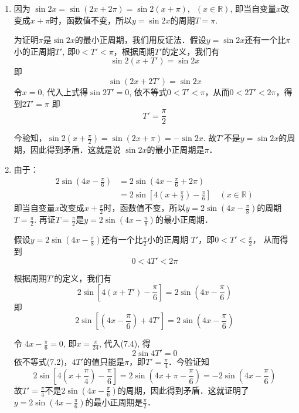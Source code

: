 \begin{solution}
\begin{enumerate}
\item
    因为 $\sin2x =\sin(2x+2\pi)=\sin 2(x+\pi), \;\; (x\in\mathbb{R})$, 即当自变量$x$改变成$x+\pi$时，函数值不变，所以$y=\sin2x$的周期$T=\pi$.

为证明$\pi$是$\sin2x$的最小正周期，我们用反证法．假设$y=\sin2x$还有一个比$\pi$小的正周期$T'$, 即$0<T'<\pi$，根据周期$T'$的定义，我们有
\[\sin2 (x+T') =\sin2x\]
即
$$\sin (2x+2T') =\sin2x$$
令$x=0$, 代入上式得$\sin 2T'=0$,
依不等式$0<T'<\pi$，从而$0<2T'<2\pi$，得到$2T'=\pi$
即
\[T'=\frac{\pi}{2}\]

今验知，$\sin2\left(x+\frac{\pi}{2}\right)=\sin(2x+\pi)=-\sin2x$. 故$T'$不是$y=\sin2x$的周期，因此得到矛盾．这就是说 $\sin 2x$的最小正周期是$\pi$．



\item 由于：
\[\begin{split}
    2\sin\left(4x-\frac{\pi}{6}\right)&=2\sin\left(4x-\frac{\pi}{6}+2\pi\right)\\
    &=2\sin\left[4\left(x+\frac{\pi}{2}\right)-\frac{\pi}{6}\right]\quad (x\in\mathbb{R})
\end{split}\]
即当自变量$x$改变成$x+\frac{\pi}{2}$时，函数值不变，所以$y=
2\sin\left(4x-\frac{\pi}{8}\right)$的周期$T=\frac{\pi}{2}$. 再证$T=\frac{\pi}{2}$是$y=2\sin\left(4x-\frac{\pi}{8}\right)$的最小正周期．

假设$y=2\sin\left(4x-\frac{\pi}{8}\right)$还有一个比$\frac{\pi}{2}$小的正周期
$T'$，即$0<T'<\frac{\pi}{2}$，
从而得到
\begin{equation}
    0<4T'<2\pi
\end{equation}

根据周期$T'$的定义，我们有
\begin{equation}
    2\sin \left[4(x+T')-\frac{\pi}{6}\right]=2\sin \left(4x-\frac{\pi}{6}\right)
\end{equation}
即
\begin{equation}
    2\sin \left[\left(4x-\frac{\pi}{6}\right)+4T'\right]=2\sin \left(4x-\frac{\pi}{6}\right)
\end{equation}

令 $4x-\frac{\pi}{6}=0$, 即$x=\frac{\pi}{24}$, 代入(7.4), 得
$$2\sin 4T'=0$$
依不等式(7.2)，$4T'$的值只能是$\pi$，即$T'=\frac{\pi}{4}$．今验证知
\[2\sin\left[4\left(x+\frac{\pi}{4}\right)-\frac{\pi}{6}\right]=2\sin \left(4x+\pi-\frac{\pi}{6}\right)=-2\sin\left(4x-\frac{\pi}{6}\right)\]
故$T'=\frac{\pi}{4}$不是$2\sin\left(4x-\frac{\pi}{6}\right)$的周期，因此得到矛盾．这就证明了$y=2\sin\left(4x-\frac{\pi}{6}\right)$的最小正周期是$\frac{\pi}{2}$．
\end{enumerate}
\end{solution}


